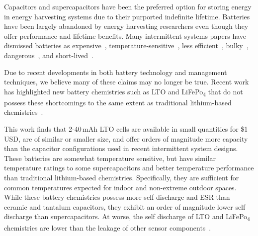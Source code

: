 Capacitors and supercapacitors have been the preferred
option for storing energy in energy harvesting systems due to their purported
indefinite lifetime. Batteries
have been largely abandoned by energy harvesting researchers even though %
they offer performance and lifetime benefits.
Many intermittent systems papers
have dismissed batteries as
expensive~\cite{hesterNew17, hesterTragedy15, hesterFlicker17, hesterTimely17},
temperature-sensitive~\cite{hesterNew17, hesterTragedy15, hesterFlicker17, hesterTimely17, colinReconfigurable18, luciaIntermittent17},
less efficient~\cite{hesterNew17, hesterTragedy15, hesterFlicker17, hesterTimely17},
bulky~\cite{hesterNew17, hesterTragedy15, hesterFlicker17, hesterTimely17, yervaGrafting12},
dangerous~\cite{hesterNew17, hesterTragedy15, hesterFlicker17, hesterTimely17},
and
short-lived~\cite{hesterNew17, hesterTragedy15, hesterFlicker17, hesterTimely17, colinReconfigurable18, luciaIntermittent17, yervaGrafting12}.

Due to recent developments in both battery technology and management
techniques, we believe many of these claims may no longer
be true. Recent work has
highlighted new battery chemistries such as LTO and LiFePo\textsubscript{4} that do not possess these shortcomings
to the same extent as traditional lithium-based
chemistries~\cite{jackson2018reconsidering}.

This work finds that 2-40\,mAh LTO cells are available in small quantities
for \$1 USD, are of similar or smaller size, and offer orders of magnitude more
capacity than the capacitor configurations used in recent intermittent system
designs.
These batteries are somewhat temperature
sensitive, but have similar
temperature ratings to some supercapacitors and better temperature performance
than traditional lithium-based chemistries. Specifically, they are sufficient for
common temperatures expected for indoor and non-extreme outdoor
spaces. While these battery chemistries possess
more self discharge and ESR than ceramic and tantalum capacitors, they exhibit an
order of magnitude lower self discharge
than supercapacitors.
At worse, the self discharge of LTO and
LiFePo\textsubscript{4} chemistries are lower than the leakage of other
sensor components~\cite{jackson2018reconsidering}.

